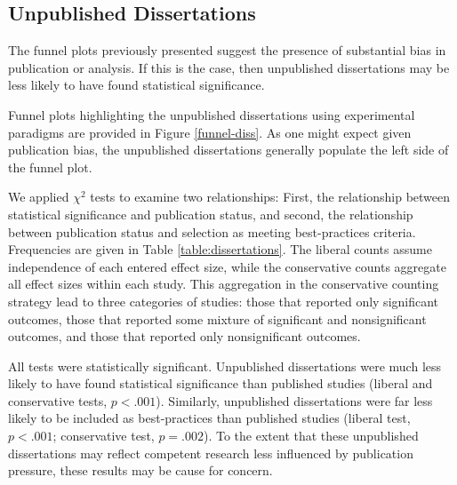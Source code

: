 \documentclass[man, mask]{apa6}
\begin{document}

\subsection{Unpublished Dissertations} %
The funnel plots previously presented suggest the presence of substantial bias in publication or analysis. If this is the case, then unpublished dissertations may be less likely to have found statistical significance. 

Funnel plots highlighting the unpublished dissertations using experimental paradigms are provided in Figure \ref{funnel-diss}. As one might expect given publication bias, the unpublished dissertations generally populate the left side of the funnel plot. 

We applied $\chi^2$ tests to examine two relationships: First, the relationship between statistical significance and publication status, and second, the relationship between publication status and selection as meeting best-practices criteria. Frequencies are given in Table \ref{table:dissertations}. The liberal counts assume independence of each entered effect size, while the conservative counts aggregate all effect sizes within each study. This aggregation in the conservative counting strategy lead to three categories of studies: those that reported only significant outcomes, those that reported some mixture of significant and nonsignificant outcomes, and those that reported only nonsignificant outcomes.

All tests were statistically significant. Unpublished dissertations were much less likely to have found statistical significance than published studies (liberal and conservative tests, $p < .001$).
Similarly, unpublished dissertations were far less likely to be included as best-practices than published studies (liberal test, $p < .001$; conservative test, $p = .002$). 
To the extent that these unpublished dissertations may reflect competent research less influenced by publication pressure, these results may be cause for concern.
\end{document}
